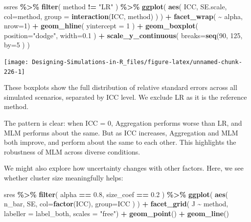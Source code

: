 \documentclass[
]{book}
\newenvironment{Shaded}{\begin{snugshade}}{\end{snugshade}}
\newcommand{\AttributeTok}[1]{\textcolor[rgb]{0.13,0.29,0.53}{#1}}
\newcommand{\DecValTok}[1]{\textcolor[rgb]{0.00,0.00,0.81}{#1}}
\newcommand{\FloatTok}[1]{\textcolor[rgb]{0.00,0.00,0.81}{#1}}
\newcommand{\FunctionTok}[1]{\textcolor[rgb]{0.13,0.29,0.53}{\textbf{#1}}}
\newcommand{\NormalTok}[1]{#1}
\newcommand{\SpecialCharTok}[1]{\textcolor[rgb]{0.81,0.36,0.00}{\textbf{#1}}}
\newcommand{\StringTok}[1]{\textcolor[rgb]{0.31,0.60,0.02}{#1}}
\begin{document}
\begin{Shaded}
\begin{Highlighting}[]
\NormalTok{ssres }\SpecialCharTok{\%\textgreater{}\%} 
  \FunctionTok{filter}\NormalTok{( method }\SpecialCharTok{!=} \StringTok{"LR"}\NormalTok{ ) }\SpecialCharTok{\%\textgreater{}\%}
  \FunctionTok{ggplot}\NormalTok{( }\FunctionTok{aes}\NormalTok{( ICC, SE.scale, }\AttributeTok{col=}\NormalTok{method, }
               \AttributeTok{group =} \FunctionTok{interaction}\NormalTok{(ICC, method) ) ) }\SpecialCharTok{+}
  \FunctionTok{facet\_wrap}\NormalTok{( }\SpecialCharTok{\textasciitilde{}}\NormalTok{ alpha, }\AttributeTok{nrow=}\DecValTok{1}\NormalTok{) }\SpecialCharTok{+}
  \FunctionTok{geom\_hline}\NormalTok{( }\AttributeTok{yintercept =} \DecValTok{1}\NormalTok{  ) }\SpecialCharTok{+}
  \FunctionTok{geom\_boxplot}\NormalTok{( }\AttributeTok{position=}\StringTok{"dodge"}\NormalTok{, }\AttributeTok{width=}\FloatTok{0.1}\NormalTok{ ) }\SpecialCharTok{+}
  \FunctionTok{scale\_y\_continuous}\NormalTok{( }\AttributeTok{breaks=}\FunctionTok{seq}\NormalTok{(}\DecValTok{90}\NormalTok{, }\DecValTok{125}\NormalTok{, }\AttributeTok{by=}\DecValTok{5}\NormalTok{ ) ) }
\end{Highlighting}
\end{Shaded}

\begin{center}\texttt{[image: Designing-Simulations-in-R\_files/figure-latex/unnamed-chunk-226-1]} \end{center}

These boxplots show the full distribution of relative standard errors across all simulated scenarios, separated by ICC level. We exclude LR as it is the reference method.

The pattern is clear: when ICC = 0, Aggregation performs worse than LR, and MLM performs about the same. But as ICC increases, Aggregation and MLM both improve, and perform about the same to each other.
This highlights the robustness of MLM across diverse conditions.

We might also explore how uncertainty changes with other factors.
Here, we see whether cluster size meaningfully helps:

\begin{Shaded}
\begin{Highlighting}[]
\NormalTok{sres }\SpecialCharTok{\%\textgreater{}\%}
  \FunctionTok{filter}\NormalTok{( alpha }\SpecialCharTok{==} \FloatTok{0.8}\NormalTok{, size\_coef }\SpecialCharTok{==} \FloatTok{0.2}\NormalTok{ ) }\SpecialCharTok{\%\textgreater{}\%}
\FunctionTok{ggplot}\NormalTok{( }\FunctionTok{aes}\NormalTok{( n\_bar, SE, }\AttributeTok{col=}\FunctionTok{factor}\NormalTok{(ICC), }\AttributeTok{group=}\NormalTok{ICC ) ) }\SpecialCharTok{+}
  \FunctionTok{facet\_grid}\NormalTok{( J }\SpecialCharTok{\textasciitilde{}}\NormalTok{ method, }\AttributeTok{labeller =}\NormalTok{ label\_both, }\AttributeTok{scales =} \StringTok{"free"}\NormalTok{) }\SpecialCharTok{+}
  \FunctionTok{geom\_point}\NormalTok{() }\SpecialCharTok{+} \FunctionTok{geom\_line}\NormalTok{()}
\end{Highlighting}
\end{Shaded}
\end{document}
